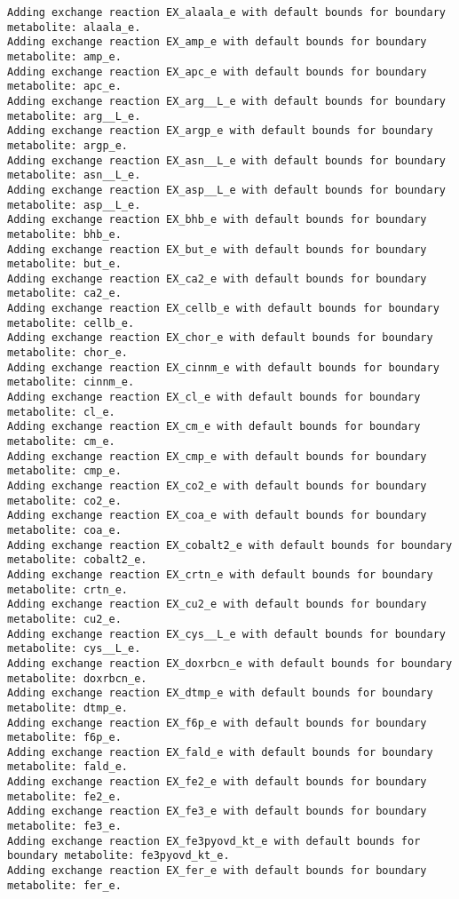 \documentclass[
  letterpaper,
  DIV=11,
  numbers=noendperiod]{scrartcl}
\begin{document}
\begin{verbatim}
Adding exchange reaction EX_alaala_e with default bounds for boundary metabolite: alaala_e.
Adding exchange reaction EX_amp_e with default bounds for boundary metabolite: amp_e.
Adding exchange reaction EX_apc_e with default bounds for boundary metabolite: apc_e.
Adding exchange reaction EX_arg__L_e with default bounds for boundary metabolite: arg__L_e.
Adding exchange reaction EX_argp_e with default bounds for boundary metabolite: argp_e.
Adding exchange reaction EX_asn__L_e with default bounds for boundary metabolite: asn__L_e.
Adding exchange reaction EX_asp__L_e with default bounds for boundary metabolite: asp__L_e.
Adding exchange reaction EX_bhb_e with default bounds for boundary metabolite: bhb_e.
Adding exchange reaction EX_but_e with default bounds for boundary metabolite: but_e.
Adding exchange reaction EX_ca2_e with default bounds for boundary metabolite: ca2_e.
Adding exchange reaction EX_cellb_e with default bounds for boundary metabolite: cellb_e.
Adding exchange reaction EX_chor_e with default bounds for boundary metabolite: chor_e.
Adding exchange reaction EX_cinnm_e with default bounds for boundary metabolite: cinnm_e.
Adding exchange reaction EX_cl_e with default bounds for boundary metabolite: cl_e.
Adding exchange reaction EX_cm_e with default bounds for boundary metabolite: cm_e.
Adding exchange reaction EX_cmp_e with default bounds for boundary metabolite: cmp_e.
Adding exchange reaction EX_co2_e with default bounds for boundary metabolite: co2_e.
Adding exchange reaction EX_coa_e with default bounds for boundary metabolite: coa_e.
Adding exchange reaction EX_cobalt2_e with default bounds for boundary metabolite: cobalt2_e.
Adding exchange reaction EX_crtn_e with default bounds for boundary metabolite: crtn_e.
Adding exchange reaction EX_cu2_e with default bounds for boundary metabolite: cu2_e.
Adding exchange reaction EX_cys__L_e with default bounds for boundary metabolite: cys__L_e.
Adding exchange reaction EX_doxrbcn_e with default bounds for boundary metabolite: doxrbcn_e.
Adding exchange reaction EX_dtmp_e with default bounds for boundary metabolite: dtmp_e.
Adding exchange reaction EX_f6p_e with default bounds for boundary metabolite: f6p_e.
Adding exchange reaction EX_fald_e with default bounds for boundary metabolite: fald_e.
Adding exchange reaction EX_fe2_e with default bounds for boundary metabolite: fe2_e.
Adding exchange reaction EX_fe3_e with default bounds for boundary metabolite: fe3_e.
Adding exchange reaction EX_fe3pyovd_kt_e with default bounds for boundary metabolite: fe3pyovd_kt_e.
Adding exchange reaction EX_fer_e with default bounds for boundary metabolite: fer_e.

\end{verbatim}
\end{document}
